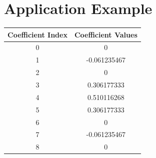 \section{Application Example}\label{sec:AppEx}
\begin{table}[H]
    \begin{center}
        \begin{tabular}{|c|c|}
            \hline
            \textbf{Coefficient Index} & \textbf{Coefficient Values} \\ \hline
            0                          & 0                           \\ \hline
            1                          & -0.061235467                \\ \hline
            2                          & 0                           \\ \hline
            3                          & 0.306177333                 \\ \hline
            4                          & 0.510116268                 \\ \hline
            5                          & 0.306177333                 \\ \hline
            6                          & 0                           \\ \hline
            7                          & -0.061235467                \\ \hline
            8                          & 0                           \\ \hline
        \end{tabular}
    \end{center}
\end{table}

